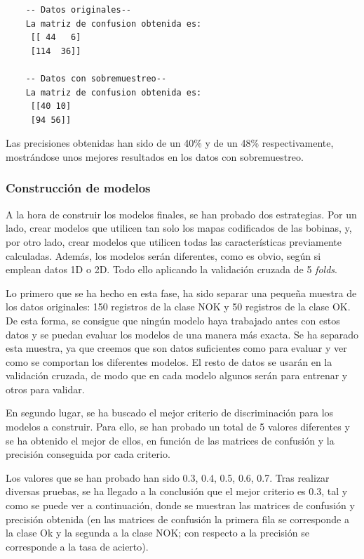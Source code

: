 \begin{verbatim}
    -- Datos originales--
    La matriz de confusion obtenida es:
     [[ 44   6]
     [114  36]]

    -- Datos con sobremuestreo--
    La matriz de confusion obtenida es:
     [[40 10]
     [94 56]]
\end{verbatim}

Las precisiones obtenidas han sido de un 40\% y de un 48\% respectivamente, mostrándose unos mejores resultados en los datos con sobremuestreo.

\subsubsection{Construcción de modelos}
A la hora de construir los modelos finales, se han probado dos estrategias. Por un lado, crear modelos que utilicen tan solo los mapas codificados de las bobinas, y, por otro lado, crear modelos que utilicen todas las características previamente calculadas. Además, los modelos serán diferentes, como es obvio, según si emplean datos 1D o 2D. Todo ello aplicando la validación cruzada de 5 \emph{folds}.

Lo primero que se ha hecho en esta fase, ha sido separar una pequeña muestra de los datos originales: 150 registros de la clase NOK y 50 registros de la clase OK. De esta forma, se consigue que ningún modelo haya trabajado antes con estos datos y se puedan evaluar los modelos de una manera más exacta. Se ha separado esta muestra, ya que creemos que son datos suficientes como para evaluar y ver como se comportan los diferentes modelos. El resto de datos se usarán en la validación cruzada, de modo que en cada modelo algunos serán para entrenar y otros para validar.

En segundo lugar, se ha buscado el mejor criterio de discriminación para los modelos a construir. Para ello, se han probado un total de 5 valores diferentes y se ha obtenido el mejor de ellos, en función de las matrices de confusión y la precisión conseguida por cada criterio.

Los valores que se han probado han sido 0.3, 0.4, 0.5, 0.6, 0.7. Tras realizar diversas pruebas, se ha llegado a la conclusión que el mejor criterio es 0.3, tal y como se puede ver a continuación, donde se muestran las matrices de confusión y precisión obtenida (en las matrices de confusión la primera fila se corresponde a la clase Ok y la segunda a la clase NOK; con respecto a la precisión se corresponde a la tasa de acierto).

